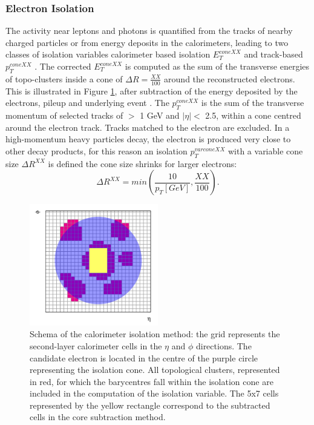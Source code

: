 \subsubsection{Electron Isolation}
\label{chap2:Objects:Egamma:EIso}
The activity near leptons and photons is quantified from the tracks of nearby charged particles or from energy deposits in the calorimeters, leading to two classes of isolation variables calorimeter based isolation $E^{coneXX}_{T}$ and track-based $p_T^{coneXX}$ \cite{Electron_Reco_Id_Run1}. The corrected $E^{coneXX}_{T}$ is computed as the sum of the transverse energies of topo-clusters inside a cone of $\Delta R = \frac{XX}{100}$ around the reconstructed electrons. This is illustrated in Figure \ref{fig:chap2:Objects:Egamma:EIso:Schema}, after subtraction of the energy deposited by the electrons, pileup and underlying event \cite{PileUp_IsoExtract}. The $p_T^{coneXX}$ is the sum of the transverse momentum of selected tracks of \pT $>$ 1 GeV and $|\eta|<$ 2.5, within a cone centred around the electron track. Tracks matched to the electron are excluded. In a high-momentum heavy particles decay, the electron is produced very close to other decay products, for this reason an isolation $p_T^{varconeXX}$ with a variable cone size $\Delta R^{XX}$ is defined the cone size shrinks for larger \pT electrons:
\begin{equation}
    \Delta R^{XX} = min(\frac{10}{p_T[GeV]}, \frac{XX}{100}).
\end{equation}
\begin{figure}[ht]
    \centering
    \includegraphics[width=0.5\textwidth]{Ch2/Img/Iso_Schema.png}
    \caption{Schema of the calorimeter isolation method: the grid represents the second-layer calorimeter cells in the $\eta$ and $\phi$ directions. The candidate electron is located in the centre of the purple circle representing the isolation cone. All topological clusters, represented in red, for which the barycentres fall within the isolation cone are included in the computation of the isolation variable. The 5x7 cells represented by the yellow rectangle correspond to the subtracted cells in the core subtraction method.}
    \label{fig:chap2:Objects:Egamma:EIso:Schema}
\end{figure}
